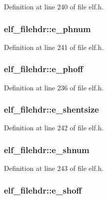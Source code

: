 Definition at line 240 of file elf.h.
\subsubsection[{e\_\-phnum}]{ {\bf elf\_\-filehdr::e\_\-phnum}}\label{structelf__filehdr_51e3b38f93e03039a04de4ebf30f4570}




Definition at line 241 of file elf.h.
\subsubsection[{e\_\-phoff}]{ {\bf elf\_\-filehdr::e\_\-phoff}}\label{structelf__filehdr_7081eff94f892e2ed00abeaee98755e1}




Definition at line 236 of file elf.h.
\subsubsection[{e\_\-shentsize}]{ {\bf elf\_\-filehdr::e\_\-shentsize}}\label{structelf__filehdr_646c876893b0ae04b2e616d623bbd3d0}




Definition at line 242 of file elf.h.
\subsubsection[{e\_\-shnum}]{ {\bf elf\_\-filehdr::e\_\-shnum}}\label{structelf__filehdr_ffd4bd4270cea19de75d75c6c00393bb}




Definition at line 243 of file elf.h.
\subsubsection[{e\_\-shoff}]{ {\bf elf\_\-filehdr::e\_\-shoff}}\label{structelf__filehdr_8ca7d67770584008fb632fa4b83ca73a}




